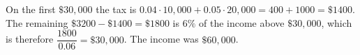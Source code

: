 On the first $\$30{,}000$ the tax is $0.04\cdot10{,}000+0.05\cdot20{,}000=400+1000=\$1400$. The remaining $\$3200-\$1400=\$1800$ is $6\%$ of the income above $\$30{,}000$, which is therefore $\dfrac{1800}{0.06}=\$30{,}000$. The income was $\boxed{\$60{,}000}$.
